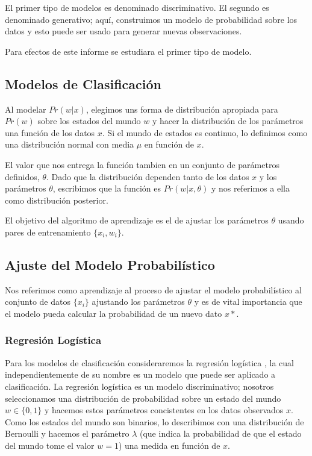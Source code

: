 \documentclass[letter,12pt]{report}
\begin{document}
El primer tipo de modelos es denominado discriminativo. El segundo es denominado
generativo; aquí, construimos un modelo de probabilidad sobre los datos y esto puede ser
usado para generar nuevas observaciones.

Para efectos de este informe se estudiara el primer tipo de modelo.

\subsection{Modelos de Clasificación}
Al modelar $Pr(w|x)$, elegimos uns forma de distribución apropiada para $Pr(w)$ sobre los
estados del mundo $w$ y hacer la distribución de los parámetros una función de los datos
$x$. Si el mundo de estados es continuo, lo definimos como una distribución normal con
media $\mu$ en función de $x$\cite{MLClass}.

El valor que nos entrega la función tambien en un conjunto de parámetros definidos,
$\theta$. Dado que la distribución dependen tanto de los datos $x$ y los parámetros
$\theta$, escribimos que la función es $Pr(w|x, \theta)$ y nos referimos a ella como
distribución posterior.

El objetivo del algoritmo de aprendizaje es el de ajustar los parámetros $\theta$ usando
pares de entrenamiento $\{x_i, w_i\}$.

\subsection{Ajuste del Modelo Probabilístico}
Nos referimos como aprendizaje al proceso de ajustar el modelo probabilístico al conjunto
de datos $\{x_i\}$ ajustando los parámetros $\theta$ y es de vital importancia que el
modelo pueda calcular la probabilidad de un nuevo dato $x*$\cite{Probab}.

\subsubsection{Regresión Logística}
Para los modelos de clasificación consideraremos la regresión logística \cite{LogicR}, la cual
independientemente de su nombre es un modelo que puede ser aplicado a clasificación. La
regresión logística es un modelo  discriminativo; nosotros seleccionamos una distribución
de probabilidad sobre un estado del mundo $w \in \{0, 1\}$ y hacemos estos parámetros
concistentes en los datos observados $x$. Como los estados del mundo son binarios,
lo describimos con una distribución de Bernoulli y hacemos el parámetro $\lambda$ (que
indica la probabilidad de que el estado del mundo tome el valor $w=1$) una medida en
función de $x$.
\end{document}
